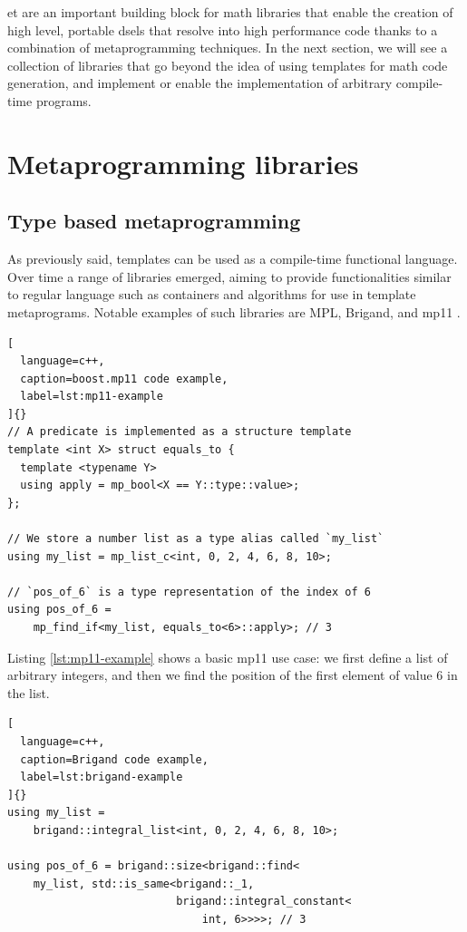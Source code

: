 \documentclass[../main]{subfiles}
\begin{document}
\acrlong{et} are an important building block for \cpp math libraries that
enable the creation of high level, portable \glspl{dsel} that resolve into
high performance code thanks to a combination of metaprogramming techniques.
In the next section, we will see a collection of libraries that go beyond the
idea of using templates for math code generation, and implement or enable the
implementation of arbitrary compile-time programs.

\section{
  Metaprogramming libraries
}
\label{lbl:meta-libraries}

\subsection{
  Type based metaprogramming
}

As previously said, \cpp templates can be used as a compile-time
functional language. Over time a range of libraries emerged, aiming to provide
functionalities similar to regular language such as containers and algorithms
for use in template metaprograms. Notable examples of such libraries are
MPL\cite{mpl}, Brigand\cite{brigand}, and mp11 \cite{mp11}.

\begin{lstlisting}[
  language=c++,
  caption=boost.mp11 code example,
  label=lst:mp11-example
]{}
// A predicate is implemented as a structure template
template <int X> struct equals_to {
  template <typename Y>
  using apply = mp_bool<X == Y::type::value>;
};

// We store a number list as a type alias called `my_list`
using my_list = mp_list_c<int, 0, 2, 4, 6, 8, 10>;

// `pos_of_6` is a type representation of the index of 6
using pos_of_6 =
    mp_find_if<my_list, equals_to<6>::apply>; // 3
\end{lstlisting}

Listing \ref{lst:mp11-example} shows a basic mp11 use case: we first define a
list of arbitrary integers, and then we find the position of the first element
of value 6 in the list.

\begin{lstlisting}[
  language=c++,
  caption=Brigand code example,
  label=lst:brigand-example
]{}
using my_list =
    brigand::integral_list<int, 0, 2, 4, 6, 8, 10>;

using pos_of_6 = brigand::size<brigand::find<
    my_list, std::is_same<brigand::_1,
                          brigand::integral_constant<
                              int, 6>>>>; // 3
\end{lstlisting}
\end{document}

